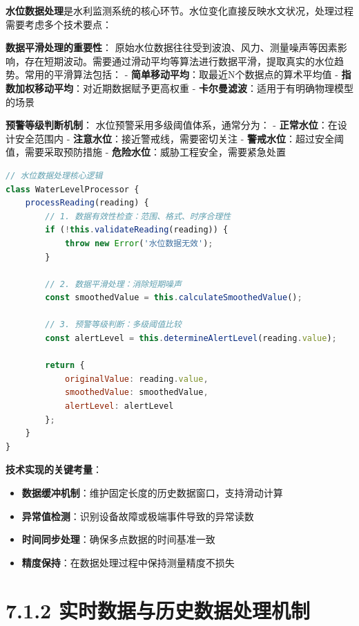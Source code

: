 \textbf{水位数据处理}是水利监测系统的核心环节。水位变化直接反映水文状况，处理过程需要考虑多个技术要点：

\textbf{数据平滑处理的重要性}： 原始水位数据往往受到波浪、风力、测量噪声等因素影响，存在短期波动。需要通过滑动平均等算法进行数据平滑，提取真实的水位趋势。常用的平滑算法包括： - \textbf{简单移动平均}：取最近N个数据点的算术平均值 - \textbf{指数加权移动平均}：对近期数据赋予更高权重 - \textbf{卡尔曼滤波}：适用于有明确物理模型的场景

\textbf{预警等级判断机制}： 水位预警采用多级阈值体系，通常分为： - \textbf{正常水位}：在设计安全范围内 - \textbf{注意水位}：接近警戒线，需要密切关注 - \textbf{警戒水位}：超过安全阈值，需要采取预防措施 - \textbf{危险水位}：威胁工程安全，需要紧急处置

\begin{lstlisting}[language=Javascript]
// 水位数据处理核心逻辑
class WaterLevelProcessor {
    processReading(reading) {
        // 1. 数据有效性检查：范围、格式、时序合理性
        if (!this.validateReading(reading)) {
            throw new Error('水位数据无效');
        }
        
        // 2. 数据平滑处理：消除短期噪声
        const smoothedValue = this.calculateSmoothedValue();
        
        // 3. 预警等级判断：多级阈值比较
        const alertLevel = this.determineAlertLevel(reading.value);
        
        return {
            originalValue: reading.value,
            smoothedValue: smoothedValue,
            alertLevel: alertLevel
        };
    }
}
\end{lstlisting}

\textbf{技术实现的关键考量}：

\begin{itemize}
\tightlist
\item
  \textbf{数据缓冲机制}：维护固定长度的历史数据窗口，支持滑动计算
\item
  \textbf{异常值检测}：识别设备故障或极端事件导致的异常读数
\item
  \textbf{时间同步处理}：确保多点数据的时间基准一致
\item
  \textbf{精度保持}：在数据处理过程中保持测量精度不损失
\end{itemize}

\section{7.1.2 实时数据与历史数据处理机制}

